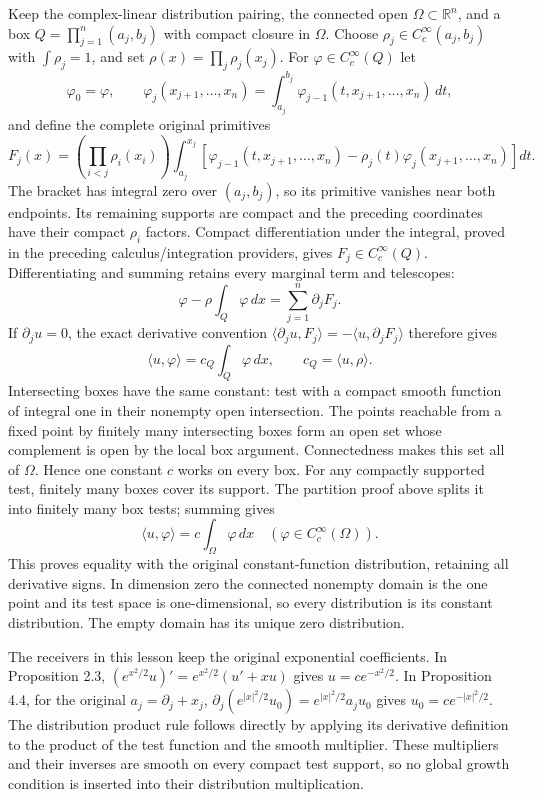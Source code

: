 \documentclass[
  11pt,
]{article}
\begin{document}
Keep the complex-linear distribution pairing, the connected open
\(\Omega\subset\mathbb R^n\), and a box \(Q=\prod_{j=1}^n(a_j,b_j)\)
with compact closure in \(\Omega\). Choose
\(\rho_j\in C_c^\infty(a_j,b_j)\) with \(\int\rho_j=1\), and set
\(\rho(x)=\prod_j\rho_j(x_j)\). For \(\varphi\in C_c^\infty(Q)\) let \[
 \varphi_0=\varphi,\qquad
 \varphi_j(x_{j+1},\ldots,x_n)
 =\int_{a_j}^{b_j}\varphi_{j-1}(t,x_{j+1},\ldots,x_n)\,dt,
\] and define the complete original primitives \[
 F_j(x)=
 \left(\prod_{i<j}\rho_i(x_i)\right)
 \int_{a_j}^{x_j}
 \left[\varphi_{j-1}(t,x_{j+1},\ldots,x_n)
       -\rho_j(t)\varphi_j(x_{j+1},\ldots,x_n)\right]dt.
 \tag{P261.24}
\] The bracket has integral zero over \((a_j,b_j)\), so its primitive
vanishes near both endpoints. Its remaining supports are compact and the
preceding coordinates have their compact \(\rho_i\) factors. Compact
differentiation under the integral, proved in the preceding
calculus/integration providers, gives \(F_j\in C_c^\infty(Q)\).
Differentiating and summing retains every marginal term and telescopes:
\[
 \varphi-\rho\int_Q\varphi\,dx=\sum_{j=1}^n\partial_jF_j.
 \tag{P261.25}
\] If \(\partial_j u=0\), the exact derivative convention
\(\langle\partial_j u,F_j\rangle=-\langle u,\partial_jF_j\rangle\)
therefore gives \[
 \langle u,\varphi\rangle=c_Q\int_Q\varphi\,dx,\qquad
 c_Q=\langle u,\rho\rangle.
 \tag{P261.26}
\] Intersecting boxes have the same constant: test with a compact smooth
function of integral one in their nonempty open intersection. The points
reachable from a fixed point by finitely many intersecting boxes form an
open set whose complement is open by the local box argument.
Connectedness makes this set all of \(\Omega\). Hence one constant \(c\)
works on every box. For any compactly supported test, finitely many
boxes cover its support. The partition proof above splits it into
finitely many box tests; summing gives \[
 \langle u,\varphi\rangle=c\int_\Omega\varphi\,dx
 \quad(\varphi\in C_c^\infty(\Omega)).
 \tag{P261.27}
\] This proves equality with the original constant-function
distribution, retaining all derivative signs. In dimension zero the
connected nonempty domain is the one point and its test space is
one-dimensional, so every distribution is its constant distribution. The
empty domain has its unique zero distribution.

The receivers in this lesson keep the original exponential coefficients.
In Proposition 2.3, \((e^{x^2/2}u)'=e^{x^2/2}(u'+xu)\) gives
\(u=ce^{-x^2/2}\). In Proposition 4.4, for the original
\(a_j=\partial_j+x_j\), \(\partial_j(e^{|x|^2/2}u_0)=e^{|x|^2/2}a_ju_0\)
gives \(u_0=ce^{-|x|^2/2}\). The distribution product rule follows
directly by applying its derivative definition to the product of the
test function and the smooth multiplier. These multipliers and their
inverses are smooth on every compact test support, so no global growth
condition is inserted into their distribution multiplication.
\end{document}
